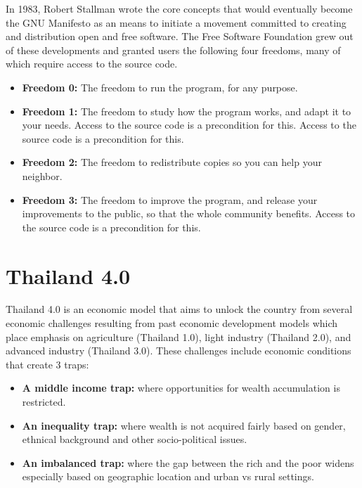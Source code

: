 \documentclass[]{book}
\providecommand{\tightlist}{%
  \setlength{\itemsep}{0pt}\setlength{\parskip}{0pt}}
\begin{document}
In 1983, Robert Stallman wrote the core concepts that would eventually become the GNU Manifesto as an means to initiate a movement committed to creating and distribution open and free software.\citep{Stallman1985} The Free Software Foundation grew out of these developments and granted users the following four freedoms, many of which require access to the source code.

\begin{itemize}
\tightlist
\item
  \textbf{Freedom 0:} The freedom to run the program, for any purpose.
\item
  \textbf{Freedom 1:} The freedom to study how the program works, and adapt it to your needs. Access to the source code is a precondition for this. Access to the source code is a precondition for this.
\item
  \textbf{Freedom 2:} The freedom to redistribute copies so you can help your neighbor.
\item
  \textbf{Freedom 3:} The freedom to improve the program, and release your improvements to the public, so that the whole community benefits. Access to the source code is a precondition for this.\citep{FSF2018}
\end{itemize}

\hypertarget{thailand-4.0}{%
\section{Thailand 4.0}\label{thailand-4.0}}

Thailand 4.0 is an economic model that aims to unlock the country from several economic challenges resulting from past economic development models which place emphasis on agriculture (Thailand 1.0), light industry (Thailand 2.0), and advanced industry (Thailand 3.0). These challenges include economic conditions that create 3 traps:

\begin{itemize}
\tightlist
\item
  \textbf{A middle income trap:} where opportunities for wealth accumulation is restricted.
\item
  \textbf{An inequality trap:} where wealth is not acquired fairly based on gender, ethnical background and other socio-political issues.
\item
  \textbf{An imbalanced trap:} where the gap between the rich and the poor widens especially based on geographic location and urban vs rural settings.
\end{itemize}
\end{document}
